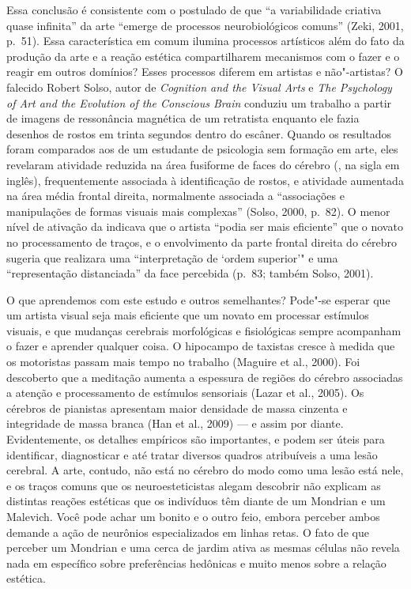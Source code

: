 Essa conclusão é consistente com o postulado de que ``a variabilidade
criativa quase infinita'' da arte ``emerge de processos neurobiológicos
comuns'' (Zeki, 2001, p.~51). Essa característica em comum ilumina
processos artísticos além do fato da produção da arte e a reação
estética compartilharem mecanismos com o fazer e o reagir em outros
domínios? Esses processos diferem em artistas e não"-artistas? O falecido
Robert Solso, autor de \emph{Cognition and the Visual Arts} e \emph{The
Psychology of Art and the Evolution of the Conscious Brain} conduziu um
trabalho a partir de imagens de ressonância magnética de um retratista
enquanto ele fazia desenhos de rostos em trinta segundos dentro do
escâner. Quando os resultados foram comparados aos de um estudante de
psicologia sem formação em arte, eles revelaram atividade reduzida na
área fusiforme de faces do cérebro (, na sigla em inglês),
frequentemente associada à identificação de rostos, e atividade
aumentada na área média frontal direita, normalmente associada a
``associações e manipulações de formas visuais mais complexas'' (Solso,
2000, p.~82). O menor nível de ativação da  indicava que o artista
``podia ser mais eficiente'' que o novato no processamento de traços, e
o envolvimento da parte frontal direita do cérebro sugeria que realizara
uma ``interpretação de `ordem superior'" e uma ``representação
distanciada'' da face percebida (p.~83; também Solso, 2001).

O que aprendemos com este estudo e outros semelhantes? Pode"-se esperar
que um artista visual seja mais eficiente que um novato em processar
estímulos visuais, e que mudanças cerebrais morfológicas e fisiológicas
sempre acompanham o fazer e aprender qualquer coisa. O hipocampo de
taxistas cresce à medida que os motoristas passam mais tempo no trabalho
(Maguire et al., 2000). Foi descoberto que a meditação aumenta a
espessura de regiões do cérebro associadas a atenção e processamento de
estímulos sensoriais (Lazar et al., 2005). Os cérebros de pianistas
apresentam maior densidade de massa cinzenta e integridade de massa
branca (Han et al., 2009) --- e assim por diante. Evidentemente, os
detalhes empíricos são importantes, e podem ser úteis para identificar,
diagnosticar e até tratar diversos quadros atribuíveis a uma lesão
cerebral. A arte, contudo, não está no cérebro do modo como uma lesão
está nele, e os traços comuns que os neuroesteticistas alegam descobrir
não explicam as distintas reações estéticas que os indivíduos têm diante
de um Mondrian e um Malevich. Você pode achar um bonito e o outro feio,
embora perceber ambos demande a ação de neurônios especializados em
linhas retas. O fato de que perceber um Mondrian e uma cerca de jardim
ativa as mesmas células não revela nada em específico sobre preferências
hedônicas e muito menos sobre a relação estética.

